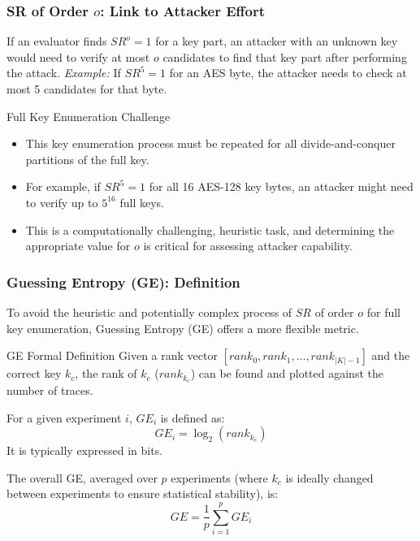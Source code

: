 \begin{frame}
    \frametitle{SR of Order $o$: Link to Attacker Effort}
        If an evaluator finds $SR^o=1$ for a key part, an attacker with an unknown key would need to verify at most $o$ candidates to find that key part after performing the attack.
        \newline
        \textit{Example:} If $SR^5=1$ for an AES byte, the attacker needs to check at most 5 candidates for that byte.
    
    \begin{block}{Full Key Enumeration Challenge}
        \begin{itemize}
            \item This key enumeration process must be repeated for all divide-and-conquer partitions of the full key.
            \item For example, if $SR^5=1$ for all 16 AES-128 key bytes, an attacker might need to verify up to $5^{16}$ full keys.
            \item This is a computationally challenging, heuristic task, and determining the appropriate value for $o$ is critical for assessing attacker capability.
        \end{itemize}
    \end{block}
\end{frame}


\begin{frame}
   
    \frametitle{Guessing Entropy (GE): Definition}
    
        To avoid the heuristic and potentially complex process of $SR$ of order $o$ for full key enumeration, Guessing Entropy (GE) offers a more flexible metric.
   
    
    \begin{block}{GE Formal Definition}
        Given a rank vector $[rank_0, rank_1, \dots, rank_{|K|-1}]$ and the correct key $k_c$, the rank of $k_c$ ($rank_{k_c}$) can be found and plotted against the number of traces.
        
        For a given experiment $i$, $GE_i$ is defined as:
        $$ GE_i = \log_2(rank_{k_c}) $$
        It is typically expressed in bits.
        
        The overall GE, averaged over $p$ experiments (where $k_c$ is ideally changed between experiments to ensure statistical stability), is:
        $$ GE = \frac{1}{p} \sum_{i=1}^{p} GE_i $$
    \end{block}
\end{frame}



